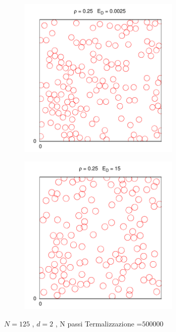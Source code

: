 \documentclass[11pt]{article}
\theoremstyle{plain}
\theoremstyle{remark}
\begin{document}
\begin{figure}
        \begin{subfigure}[b]{0.5\textwidth}
                \centering
                \includegraphics[width=0.85\textwidth]{Immagini/Soffici/SnapSolidoFreddo_2D_Nuclea}
        \end{subfigure}
         \begin{subfigure}[b]{0.5\textwidth}
                \centering
                \includegraphics[width=0.85\textwidth]{Immagini/Soffici/SnapLiquido_2D}
        \end{subfigure}
		
		 \centering  \footnotesize{$N= 125$ , $d=2$ , N passi Termalizzazione =$ 500000 $}
		\label{fig: snap2d_soft}
\end{figure}
\end{document}
